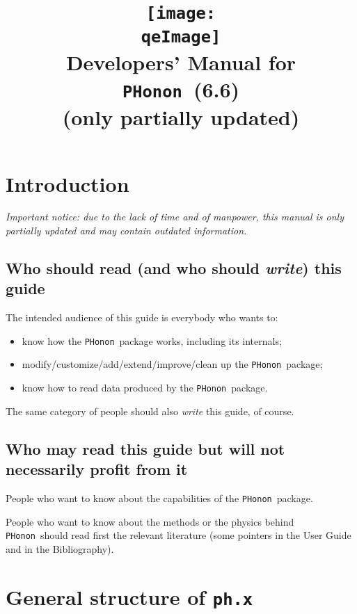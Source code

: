 \documentclass[12pt,a4paper]{article}
\def\version{6.6}
\def\qeImage{../../Doc/quantum_espresso}
\def\phx{\texttt{ph.x}}
\def\PHonon{\texttt{PHonon}}
\begin{document}
 
\author{}
\date{}
\title{
  \texttt{[image: \\qeImage]} \\
  \Huge Developers' Manual for \PHonon\ (\version)
    \\ \Large (only partially updated)
}
\maketitle

\tableofcontents

\newpage

\section{Introduction}

{\em Important notice: due to the lack of time and of manpower, this
manual is only partially updated and may contain outdated information.}

\subsection{Who should read (and who should {\em write}) this guide}

The intended audience of this guide is everybody who wants to:
\begin{itemize}
\item know how the \PHonon\ package works, including its internals;
\item modify/customize/add/extend/improve/clean up the \PHonon\ package;
\item know how to read data produced by the \PHonon\ package.
\end{itemize}
The same category of people should also {\em write} this guide, of course.

\subsection{Who may read this guide but will not necessarily profit from it}

People who want to know about the capabilities of the \PHonon\ package.

People who want to know about the methods or the physics
behind \PHonon\ should read first the relevant  
literature (some pointers in the User Guide and in the Bibliography).


\section{General structure of \phx}
\end{document}
